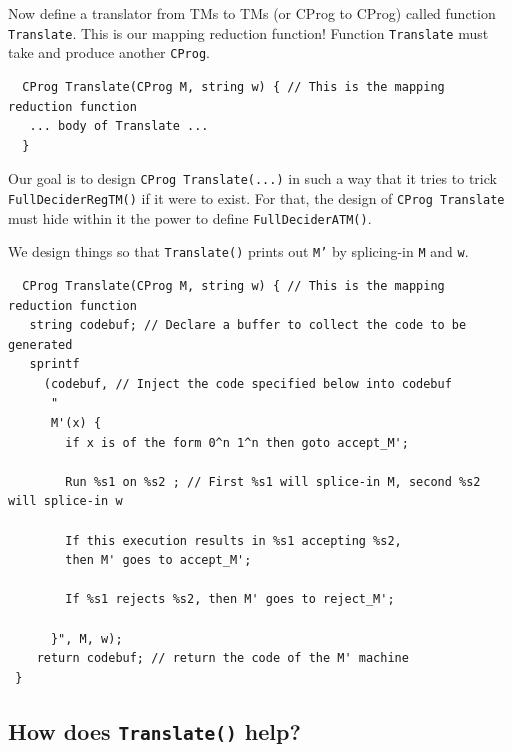 \documentclass[10pt]{article}
\begin{document}
\noindent Now define a translator from TMs to TMs (or CProg to CProg) called function {\tt Translate}.
%
This is our mapping reduction function!
%
Function {\tt Translate} must take {\tt <M,w>} and produce another {\tt CProg}.

\vspace{.3cm}

\begin{footnotesize}
\begin{verbatim}
  CProg Translate(CProg M, string w) { // This is the mapping reduction function
   ... body of Translate ...
  }
\end{verbatim}
\end{footnotesize}

\vspace{.3cm}

Our goal is to design {\tt CProg Translate(...)} in such a way that it tries to trick
{\tt  FullDeciderRegTM()} if it were to exist.
%
For that, the design of {\tt CProg Translate} must hide within it the power to define {\tt FullDeciderATM()}.

We design things so that {\tt Translate()} prints out {\tt M'} by splicing-in {\tt M} and {\tt w}.



\begin{footnotesize}
\begin{verbatim}
  CProg Translate(CProg M, string w) { // This is the mapping reduction function
   string codebuf; // Declare a buffer to collect the code to be generated
   sprintf
     (codebuf, // Inject the code specified below into codebuf
      "
      M'(x) {
        if x is of the form 0^n 1^n then goto accept_M';

        Run %s1 on %s2 ; // First %s1 will splice-in M, second %s2 will splice-in w

        If this execution results in %s1 accepting %s2,
        then M' goes to accept_M';

        If %s1 rejects %s2, then M' goes to reject_M';

      }", M, w);
    return codebuf; // return the code of the M' machine
 }

\end{verbatim}
\end{footnotesize}



\subsection{How does {\tt Translate()} help?}
\end{document}
